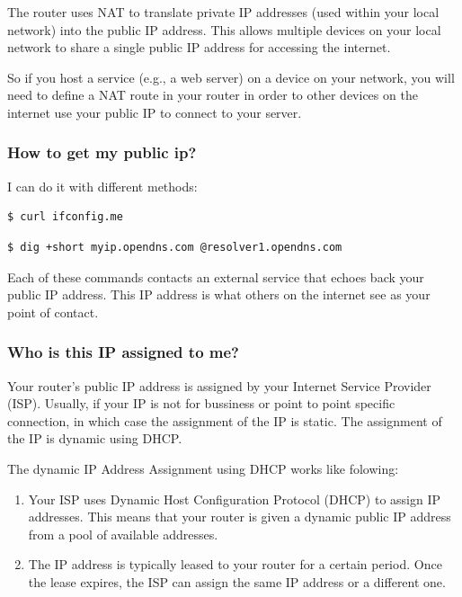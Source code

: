 \documentclass{article}
\newenvironment{codetemplate}[1][]{%
  \mybasecolorbox[#1]
  \itshape
}{%
  \endmybasecolorbox
}
\begin{document}
The router uses NAT to translate private IP addresses (used within your local network) into the public IP address. This allows multiple devices on your local network to share a single public IP address for accessing the internet.

So if you host a service (e.g., a web server) on a device on your network, you will need to define a NAT route in your router in order to other devices on the internet use your public IP to connect to your server.

\subsubsection{How to get my public ip?}

I can do it with different methods:

\begin{codetemplate}{}
\begin{verbatim}
$ curl ifconfig.me
\end{verbatim}
\end{codetemplate}

\begin{codetemplate}{}
\begin{verbatim}
$ dig +short myip.opendns.com @resolver1.opendns.com
\end{verbatim}
\end{codetemplate}

Each of these commands contacts an external service that echoes back your public IP address. This IP address is what others on the internet see as your point of contact.

\subsubsection{Who is this IP assigned to me?}

Your router's public IP address is assigned by your Internet Service Provider (ISP). Usually, if your IP is not for bussiness or point to point specific connection, in which case the assignment of the IP is static. The assignment of the IP is dynamic using DHCP.

The dynamic IP Address Assignment using DHCP works like folowing:

\begin{enumerate} 
    \item Your ISP uses Dynamic Host Configuration Protocol (DHCP) to assign IP addresses. This means that your router is given a dynamic public IP address from a pool of available addresses.
    \item The IP address is typically leased to your router for a certain period. Once the lease expires, the ISP can assign the same IP address or a different one.
\end{enumerate}
\end{document}
